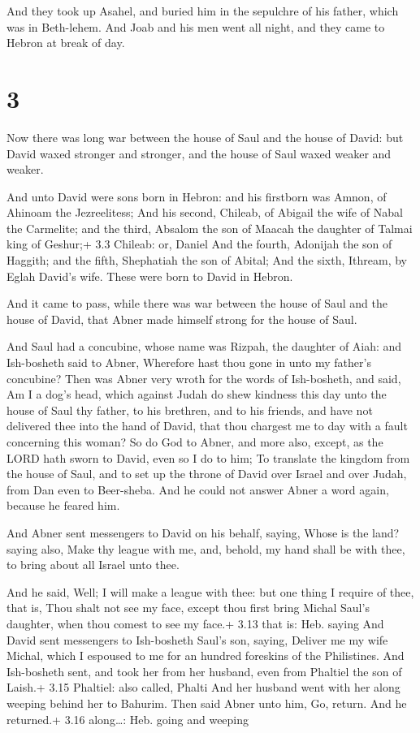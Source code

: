  And they took up Asahel, and buried him in the sepulchre
of his father, which was in Beth-lehem. And Joab and his men went all
night, and they came to Hebron at break of day.

\hypertarget{section-2}{%
\section{3}\label{section-2}}

 Now there was long war between the house of Saul and the
house of David: but David waxed stronger and stronger, and the house of
Saul waxed weaker and weaker.

 And unto David were sons born in Hebron: and his
firstborn was Amnon, of Ahinoam the Jezreelitess;  And his
second, Chileab, of Abigail the wife of Nabal the Carmelite; and the
third, Absalom the son of Maacah the daughter of Talmai king of Geshur;+
3.3 Chileab: or, Daniel  And the fourth, Adonijah the son of
Haggith; and the fifth, Shephatiah the son of Abital;  And
the sixth, Ithream, by Eglah David's wife. These were born to David in
Hebron.

 And it came to pass, while there was war between the
house of Saul and the house of David, that Abner made himself strong for
the house of Saul.

 And Saul had a concubine, whose name was Rizpah, the
daughter of Aiah: and Ish-bosheth said to Abner, Wherefore hast thou
gone in unto my father's concubine?  Then was Abner very
wroth for the words of Ish-bosheth, and said, Am I a dog's head, which
against Judah do shew kindness this day unto the house of Saul thy
father, to his brethren, and to his friends, and have not delivered thee
into the hand of David, that thou chargest me to day with a fault
concerning this woman?  So do God to Abner, and more also,
except, as the LORD hath sworn to David, even so I do to him;
 To translate the kingdom from the house of Saul, and to
set up the throne of David over Israel and over Judah, from Dan even to
Beer-sheba.  And he could not answer Abner a word again,
because he feared him.

 And Abner sent messengers to David on his behalf,
saying, Whose is the land? saying also, Make thy league with me, and,
behold, my hand shall be with thee, to bring about all Israel unto thee.

 And he said, Well; I will make a league with thee: but
one thing I require of thee, that is, Thou shalt not see my face, except
thou first bring Michal Saul's daughter, when thou comest to see my
face.+ 3.13 that is: Heb. saying  And David sent messengers
to Ish-bosheth Saul's son, saying, Deliver me my wife Michal, which I
espoused to me for an hundred foreskins of the Philistines.
 And Ish-bosheth sent, and took her from her husband, even
from Phaltiel the son of Laish.+ 3.15 Phaltiel: also called, Phalti
 And her husband went with her along weeping behind her to
Bahurim. Then said Abner unto him, Go, return. And he returned.+ 3.16
along\ldots: Heb. going and weeping

